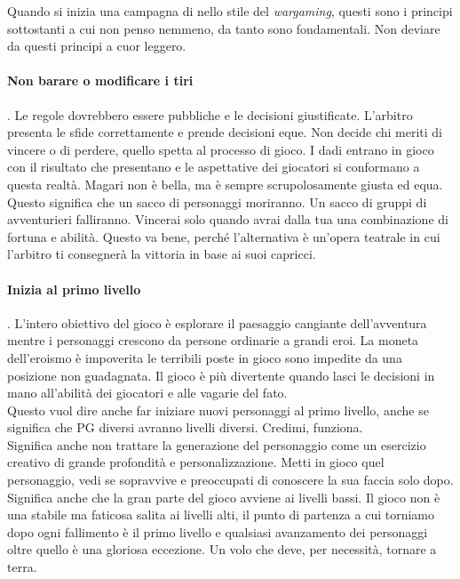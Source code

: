 


Quando si inizia una campagna di \dnd nello stile del \textit{wargaming}, questi sono i principi sottostanti a cui non penso nemmeno, da tanto sono fondamentali. Non deviare da questi principi a cuor leggero.

\paragraph{Non barare o modificare i tiri}. Le regole dovrebbero essere pubbliche e le decisioni giustificate. L'arbitro presenta le sfide correttamente e prende decisioni eque. Non decide chi meriti di vincere o di perdere, quello spetta al processo di gioco. I dadi entrano in gioco con il risultato che presentano e le aspettative dei giocatori si conformano a questa realtà. Magari non è bella, ma è sempre scrupolosamente giusta ed equa.\\
Questo significa che un sacco di personaggi moriranno. Un sacco di gruppi di avventurieri falliranno. Vincerai solo quando avrai dalla tua una combinazione di fortuna e abilità. Questo va bene, perché l'alternativa è un'opera teatrale in cui l'arbitro ti consegnerà la vittoria in base ai suoi capricci.

\paragraph{Inizia al primo livello}. L'intero obiettivo del gioco è esplorare il paesaggio cangiante dell'avventura mentre i personaggi crescono da persone ordinarie a grandi eroi. La moneta dell'eroismo è impoverita le terribili poste in gioco sono impedite da una posizione non guadagnata. Il gioco è più divertente quando lasci le decisioni in mano all'abilità dei giocatori e alle vagarie del fato.\\
Questo vuol dire anche far iniziare nuovi personaggi al primo livello, anche se significa che PG diversi avranno livelli diversi. Credimi, funziona.\\
Significa anche non trattare la generazione del personaggio come un esercizio creativo di grande profondità e personalizzazione. Metti in gioco quel personaggio, vedi se sopravvive e preoccupati di conoscere la sua faccia solo dopo.\\
Significa anche che la gran parte del gioco avviene ai livelli bassi. Il gioco non è una stabile ma faticosa salita ai livelli alti, il punto di partenza a cui torniamo dopo ogni fallimento è il primo livello e qualsiasi avanzamento dei personaggi oltre quello è una gloriosa eccezione. Un volo che deve, per necessità, tornare a terra.

